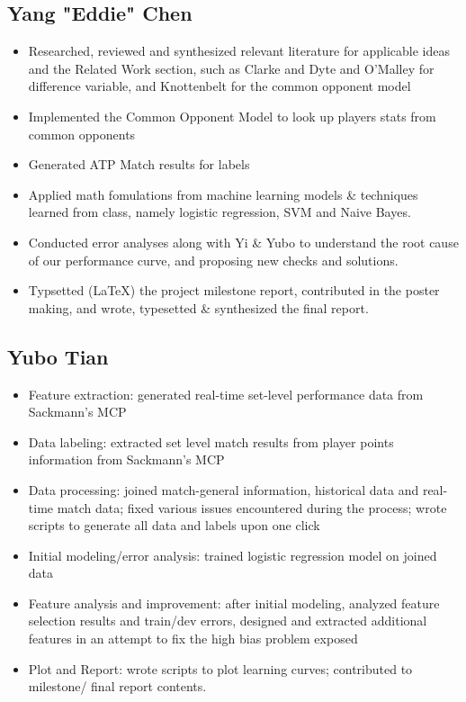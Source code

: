 \documentclass[paper=a4, fontsize=10pt]{scrartcl} %
\numberwithin{equation}{section} %
\numberwithin{figure}{section} %
\numberwithin{table}{section} %
\begin{document}
\subsection{Yang "Eddie" Chen}
\begin{itemize}
\item Researched, reviewed and synthesized relevant literature for applicable ideas and the Related Work section, such as Clarke and Dyte \cite{Clarke2010} and O'Malley \cite{omalley} for difference variable, and Knottenbelt \cite{KNOTTENBELT20123820} for the common opponent model
\item Implemented the Common Opponent Model to look up players stats from common opponents
\item Generated ATP Match results for labels
\item Applied math fomulations from machine learning models \& techniques learned from class, namely logistic regression, SVM and Naive Bayes. 
\item Conducted error analyses along with Yi \& Yubo to understand the root cause of our performance curve, and proposing new checks and solutions. 
\item Typsetted (\LaTeX) the project milestone report, contributed in the poster making, and wrote, typesetted \& synthesized the final report. 
\end{itemize}

\subsection{Yubo Tian}
\begin{itemize}
\item Feature extraction: generated real-time set-level performance data from Sackmann's MCP \cite{tennis_charting}
\item Data labeling: extracted set level match results from player points information from Sackmann's MCP \cite{tennis_charting}
\item Data processing: joined match-general information, historical data and real-time match data; fixed various issues encountered during the process; wrote scripts to generate all data and labels upon one click
\item Initial modeling/error analysis: trained logistic regression model on joined data
\item Feature analysis and improvement: after initial modeling, analyzed feature selection results and train/dev errors, designed and extracted additional features in an attempt to fix the high bias problem exposed
\item Plot and Report: wrote scripts to plot learning curves; contributed to milestone/ final report contents.
\end{itemize}
\end{document}
